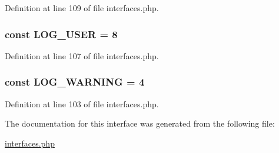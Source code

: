 Definition at line 109 of file interfaces.php.

\hypertarget{interfaceIXLLogger_a09a5a876047162a2967ad2a82b6887d3}{
\subsubsection[{LOG\_\-USER}]{\setlength{\rightskip}{0pt plus 5cm}const {\bf LOG\_\-USER} = 8}}
\label{interfaceIXLLogger_a09a5a876047162a2967ad2a82b6887d3}


Definition at line 107 of file interfaces.php.

\hypertarget{interfaceIXLLogger_acc722b40b62aea8dc0261e3fcc79eef4}{
\subsubsection[{LOG\_\-WARNING}]{\setlength{\rightskip}{0pt plus 5cm}const {\bf LOG\_\-WARNING} = 4}}
\label{interfaceIXLLogger_acc722b40b62aea8dc0261e3fcc79eef4}


Definition at line 103 of file interfaces.php.



The documentation for this interface was generated from the following file:\begin{DoxyCompactItemize}
\item 
\hyperlink{interfaces_8php}{interfaces.php}\end{DoxyCompactItemize}
